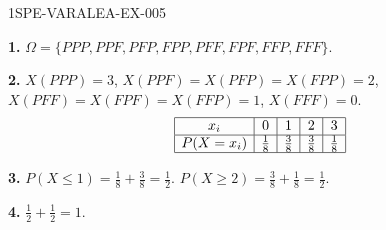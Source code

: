 \begin{corrige}{1SPE-VARALEA-EX-005}

\textbf{1.} $\Omega = \{PPP, PPF, PFP, FPP, PFF, FPF, FFP, FFF\}$.

\medskip
\textbf{2.} $X(PPP)=3$, $X(PPF)=X(PFP)=X(FPP)=2$, $X(PFF)=X(FPF)=X(FFP)=1$, $X(FFF)=0$.
\[
\begin{array}{|c|c|c|c|c|}
\hline
x_i & 0 & 1 & 2 & 3 \\
\hline
P(X=x_i) & \frac{1}{8} & \frac{3}{8} & \frac{3}{8} & \frac{1}{8} \\
\hline
\end{array}
\]

\medskip
\textbf{3.} $P(X \leq 1) = \frac{1}{8}+\frac{3}{8} = \frac{1}{2}$. \quad $P(X \geq 2) = \frac{3}{8}+\frac{1}{8} = \frac{1}{2}$.

\medskip
\textbf{4.} $\frac{1}{2}+\frac{1}{2}=1$. \checkmark

\end{corrige}

